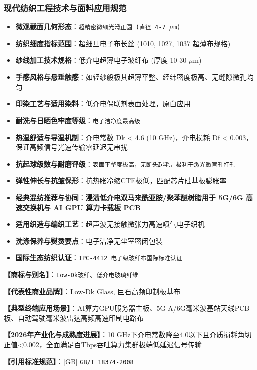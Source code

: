 \documentclass[11pt,openright,twoside,UTF8]{ctexbook}
\begin{document}
\subsubsection*{现代纺织工程技术与面料应用规范}
\begin{itemize} \setlength{\itemsep}{2pt}
    \item \textbf{微观截面几何形态}：\texttt{超精密微细光滑正圆 (直径 4-7 $\mu$m)}
    \item \textbf{纺织细度指标范围}：超细旦电子布长丝 (1010, 1027, 1037 超薄布规格)
    \item \textbf{纱线加工技术规格}：低介电超薄电子玻纤布 (厚度 10-30 $\mu$m)
    \item \textbf{手感风格与悬垂触感}：如轻纱般极其超薄平整、经纬密度极高、无缝隙微孔均匀
    \item \textbf{印染工艺与适用染料}：低介电偶联剂表面处理，原白应用
    \item \textbf{耐洗与日晒色牢度等级}：\texttt{电子洁净度最高级}
    \item \textbf{热湿舒适与导湿机制}：介电常数 Dk \textless{} 4.6 (10 GHz)，介电损耗 Df \textless{} 0.003，保证高频信号光速传输零延迟无串扰
    \item \textbf{抗起球级数与耐磨评级}：\texttt{表面平整度极高，无断头起毛，极利于激光微盲孔打孔}
    \item \textbf{弹性伸长与抗皱保形}：抗热胀冷缩CTE极低，匹配芯片硅基板膨胀率
    \item \textbf{经典混纺推荐与协同}：\textbf{浸渍低介电双马来酰亚胺/聚苯醚树脂用于 5G/6G 高速交换机与 AI GPU 算力卡载板 PCB}
    \item \textbf{适用织造与编织工艺}：超声波无接触微张力高速喷气电子织机
    \item \textbf{洗涤保养与熨烫要点}：电子洁净无尘室密闭包装
    \item \textbf{国际生态纺织认证}：\texttt{IPC-4412 电子级玻纤布国际标准认证}
\end{itemize}
\vspace{0.2cm}

\noindent\textbf{【商标与别名】}：\texttt{Low-Dk玻纤}、\texttt{低介电玻璃纤维}\par
\noindent\textbf{【代表性商业品牌】}：Low-Dk Glass, 巨石高频印制板基布\par
\noindent\textbf{【典型终端应用场景】}：AI算力GPU服务器主板、5G-A/6G毫米波基站天线PCB板、自动驾驶毫米波雷达高频高速印制电路布\par
\noindent\textbf{【2026年产业化与成熟度进展】}：10 GHz下介电常数降至4.0以下且介质损耗角切正值\textless{}0.002，全面满足百Tbps吞吐算力集群极端低延迟信号传输\par
\noindent\textbf{【引用标准规范】}：[GB] \texttt{GB/T 18374-2008}\par
\vspace{0.5cm}
\end{document}
